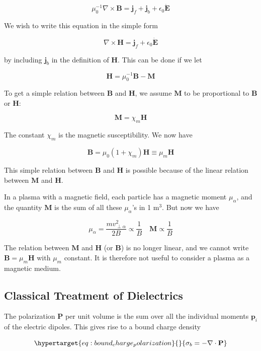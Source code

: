 \documentclass[
  notoc %
]{tufte-book}
\begin{document}
\[
\mu_0^{-1}\nabla\times\mathbf{B} = \mathbf{j}_f + \mathbf{j}_b + \epsilon_0 \dot{\mathbf{E}}
\]

We wish to write this equation in the simple form

\[
\nabla\times\mathbf{H} = \mathbf{j}_f + \epsilon_0\dot{\mathbf{E}}
\]

by including \(\mathbf{j}_b\) in the definition of \(\mathbf{H}\). This
can be done if we let

\[
\mathbf{H} = \mu_0^{-1}\mathbf{B} - \mathbf{M}
\]

To get a simple relation between \(\mathbf{B}\) and \(\mathbf{H}\), we
assume \(\mathbf{M}\) to be proportional to \(\mathbf{B}\) or
\(\mathbf{H}\):

\[
\mathbf{M} = \chi_m \mathbf{H}
\]

The constant \(\chi_m\) is the magnetic susceptibility. We now have

\[
\mathbf{B} = \mu_0(1+\chi_m)\mathbf{H} \equiv \mu_m \mathbf{H}
\]

This simple relation between \(\mathbf{B}\) and \(\mathbf{H}\) is
possible because of the linear relation between \(\mathbf{M}\) and
\(\mathbf{H}\).

In a plasma with a magnetic field, each particle has a magnetic moment
\(\mu_\alpha\), and the quantity \(\mathbf{M}\) is the sum of all these
\(\mu_\alpha\)'s in 1 \(\text{m}^3\). But now we have

\[
\mu_\alpha = \frac{mv_{\perp\alpha}^2}{2B}\propto \frac{1}{B}\quad \mathbf{M}\propto \frac{1}{B}
\]

The relation between \(\mathbf{M}\) and \(\mathbf{H}\) (or
\(\mathbf{B}\)) is no longer linear, and we cannot write
\(\mathbf{B} = \mu_m\mathbf{H}\) with \(\mu_m\) constant. It is
therefore not useful to consider a plasma as a magnetic medium.

\hypertarget{classical-treatment-of-dielectrics}{%
\subsection{Classical Treatment of
Dielectrics}\label{classical-treatment-of-dielectrics}}

The polarization \(\mathbf{P}\) per unit volume is the sum over all the
individual moments \(\mathbf{p}_i\) of the electric dipoles. This gives
rise to a bound charge density

\begin{equation}\protect\hypertarget{eq:bound_charge_polarization}{}{
\sigma_b = -\nabla\cdot\mathbf{P}
}\label{eq:bound_charge_polarization}\end{equation}
\end{document}
